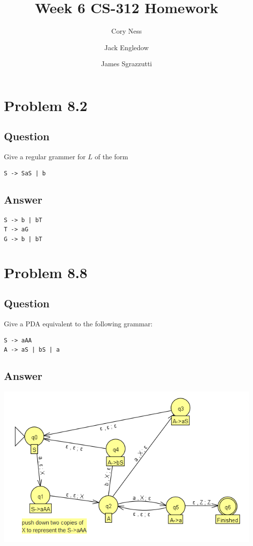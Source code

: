 \documentclass[12pt, a4paper]{article}
\title{Week 6 CS-312 Homework}
\author{
	Cory Ness
	\and
	Jack Engledow
	\and
	James Sgrazzutti
}
\begin{document}
\maketitle

\section{Problem 8.2}
\subsection{Question}
Give a regular grammer for $L$ of the form
\begin{lstlisting}
S -> SaS | b
\end{lstlisting}
\subsection{Answer}
\begin{lstlisting}
S -> b | bT
T -> aG
G -> b | bT
\end{lstlisting}

\section{Problem 8.8}
\subsection{Question}
Give a PDA equivalent to the following grammar:
\begin{lstlisting}
S -> aAA
A -> aS | bS | a
\end{lstlisting}
\subsection{Answer}
\begin{center}
\includegraphics[scale=1]{8.8}
\end{center}
\end{document}
